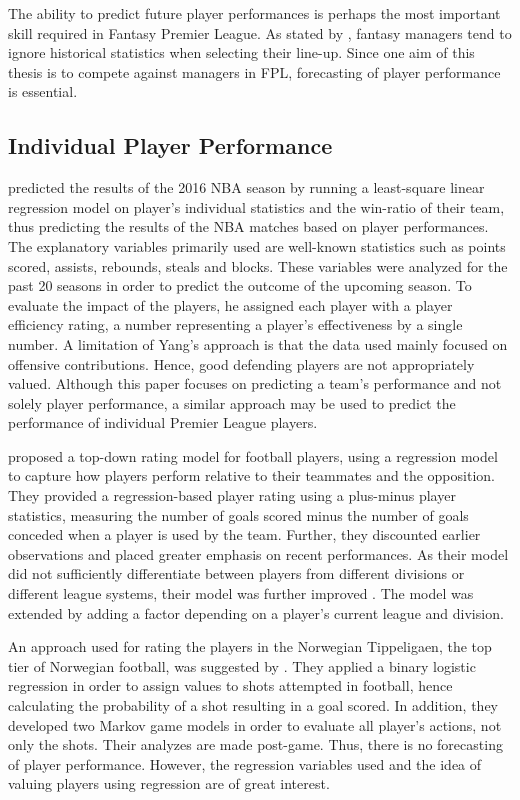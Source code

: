 The ability to predict future player performances is perhaps the most important skill required in Fantasy Premier League. As stated by \cite{Smith}, fantasy managers tend to ignore historical statistics when selecting their line-up. Since one aim of this thesis is to compete against managers in FPL, forecasting of player performance is essential.

\subsection{Individual Player Performance} \label{Forecasting_of_player_performance}

\cite{Yang} predicted the results of the 2016 NBA season by running a least-square linear regression model on player's individual statistics and the win-ratio of their team, thus predicting the results of the NBA matches based on player performances. The explanatory variables primarily used are well-known statistics such as points scored, assists, rebounds, steals and blocks. These variables were analyzed for the past 20 seasons in order to predict the outcome of the upcoming season. To evaluate the impact of the players, he assigned each player with a player efficiency rating, a number representing a player's effectiveness by a single number. A limitation of Yang's approach is that the data used mainly focused on offensive contributions. Hence, good defending players are not appropriately valued. Although this paper focuses on predicting a team's performance and not solely player performance, a similar approach may be used to predict the performance of individual Premier League players.

\newpar

\cite{Hvattum_2015} proposed a top-down rating model for football players, using a regression model to capture how players perform relative to their teammates and the opposition. They provided a regression-based player rating using a plus-minus player statistics, measuring the number of goals scored minus the number of goals conceded when a player is used by the team. Further, they discounted earlier observations and placed greater emphasis on recent performances. As their model did not sufficiently differentiate between players from different divisions or different league systems, their model was further improved \citep{Hvattum_2017}. The model was extended by adding a factor depending on a player's current league and division. 

\newpar

An approach used for rating the players in the Norwegian Tippeligaen, the top tier of Norwegian football, was suggested by \cite{vabo}. They applied a binary logistic regression in order to assign values to shots attempted in football, hence calculating the probability of a shot resulting in a goal scored. In addition, they developed two Markov game models in order to evaluate all player's actions, not only the shots. Their analyzes are made post-game. Thus, there is no forecasting of player performance. However, the regression variables used and the idea of valuing players using regression are of great interest.

